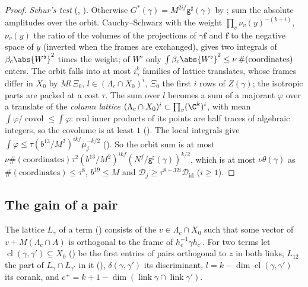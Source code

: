 \begin{proof}
\emph{Schur's test} (,
). Otherwise $G^*(\gamma)=M^{2if}\mathsf g^\sharp(\gamma)$ by
; sum the absolute amplitudes over the orbit. Cauchy--Schwarz with the weight $\prod_v\nu_v(y)^{-(k+i)}$, $\nu_v(y)$ the ratio of the volumes
of the projections of $\gamma\mathbf f$ and $\mathbf f$ to the negative space of $y$ (inverted when
the frames are exchanged), gives two integrals of $\beta_c\abs{W^\flat}^2$ times the weight; of
$W^\flat$ only $\int\beta_c\abs{W^\flat}^2\le\nu\,\#(\text{coordinates})$ enters. The orbit falls into
at most $i_\gamma^k$ families of lattice translates, whose frames differ in $X_0$ by $Ml\,\Xi_0$,
$l\in(\Lambda_c\cap X_0)^i$, $\Xi_0$ the first $i$ rows of $Z(\gamma)$; the isotropic parts are
packed at a cost $\tau$. The sum over $l$ becomes a sum of a majorant $\varphi$ over a translate of
the \emph{column lattice} $(\Lambda_c\cap X_0)^i\subset\prod_v(\C^k)^i$, with mean
$\int\varphi/\operatorname{covol}\le\int\varphi$: real inner products of its points are half traces of
algebraic integers, so the covolume is at least $1$
(). The local integrals give
$\int\varphi\le\tau(b^{13}/M^2)^{ikf}\mu_j^{-k/2}$ (). So the
orbit sum is at most $\nu\#(\text{coordinates})\tau^2(b^{13}/M^2)^{ikf}(N^f/\mathsf
g^\sharp(\gamma))^{k/2}$, which is at most $\nu\theta(\gamma)$ as $\#(\text{coordinates})\le\tau^8$, $b^{19}\le M$ and
$\mathcal D_j\ge\tau^{8-32i}\mathcal D_{\mathrm{id}}$ ($i\ge1$).
\end{proof}

\subsection{The gain of a pair}\label{sp-remain:ss:gain}

The lattice $L_\gamma$ of a term () consists of the $v\in\Lambda_c\cap
X_0$ such that some vector of $v+M(\Lambda_c\cap A)$ is orthogonal to the frame of $h_c^{-1}\gamma
h_{c'}$. For two terms let $\operatorname{cl}(\gamma,\gamma')\subseteq X_0$ () be
the first entries of pairs orthogonal to $z$ in both links, $L_{12}$ the part of $L_\gamma\cap
L_{\gamma'}$ in it (), $\delta(\gamma,\gamma')$ its discriminant,
$l=k-\dim\operatorname{cl}(\gamma,\gamma')$ its corank, and
$c^+=k+1-\dim(\operatorname{link}\gamma\cap\operatorname{link}\gamma')$.

